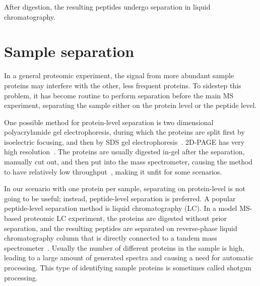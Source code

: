 

After digestion, the resulting peptides undergo separation in liquid chromatography.

\section{Sample separation}

In a general proteomic experiment, the signal from more abundant sample proteins may interfere with the other, less frequent proteins. To sidestep this problem, it has become routine to perform separation before the main MS experiment, separating the sample either on the protein level or the peptide level.

One possible method for protein-level separation is two dimensional polyacrylamide gel electrophoresis, during which the proteins are split first by isoelectric focusing, and then by SDS gel electrophoresis~\cite{o1975high}. 2D-PAGE has very high resolution~\cite{klose1995two}. The proteins are usually digested in-gel after the separation, manually cut out, and then put into the mass spectrometer, causing the method to have relatively low throughput~\cite{patton2002two}, making it unfit for some scenarios.

In our scenario with one protein per sample, separating on protein-level is not going to be useful; instead, peptide-level separation is preferred. A popular peptide-level separation method is liquid chromatography (LC). In a model MS-based proteomic LC experiment, the proteins are digested without prior separation, and the resulting peptides are separated on reverse-phase liquid chromatography column that is directly connected to a tandem mass spectrometer~\cite{washburn2001large}. Usually the number of different proteins in the sample is high, leading to a large amount of generated spectra and causing a need for automatic processing. This type of identifying sample proteins is sometimes called shotgun processing.

